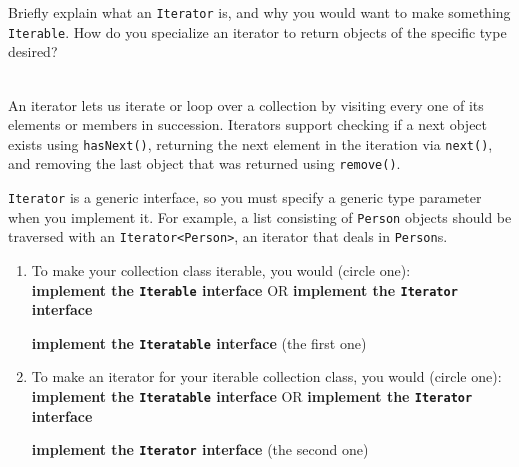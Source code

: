 Briefly explain what an \texttt{Iterator} is, and why you would want
to make something \texttt{Iterable}. How do you specialize an iterator to return objects of the specific type desired? \\ \\
\begin{answer}
An iterator lets us iterate or loop over a collection by visiting every one of its elements or members in succession.
Iterators support checking if a next object exists using \texttt{hasNext()}, returning the next element in the iteration via \texttt{next()}, and removing the last object that was returned using \texttt{remove()}.

\texttt{Iterator} is a generic interface, so you must specify a generic type parameter when you implement it.
For example, a list consisting of \texttt{Person} objects should be traversed with an \texttt{Iterator<Person>}, an iterator that deals in \texttt{Person}s.
\end{answer}
\begin{enumerate}
	\item To make your collection class iterable, you would (circle one):\\
	\textbf{implement the \texttt{Iterable} interface} OR \textbf{implement the \texttt{Iterator} interface}\\
	\begin{answer}
		\textbf{implement the \texttt{Iteratable} interface} (the first one)
	\end{answer}
	\item To make an iterator for your iterable collection class, you would (circle one):\\
	\textbf{implement the \texttt{Iteratable} interface} OR \textbf{implement the \texttt{Iterator} interface}\\
	\begin{answer}
	\textbf{implement the \texttt{Iterator} interface} (the second one)
	\end{answer}
\end{enumerate}


\vspace{24pt}